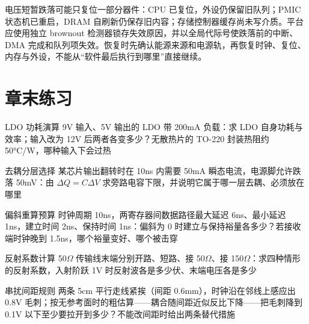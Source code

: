 
电压短暂跌落可能只复位一部分器件：CPU 已复位，外设仍保留旧队列；PMIC 状态机已重启，DRAM 自刷新仍保存旧内容；存储控制器缓存尚未写介质。平台应使用独立 brownout 检测器锁存失效原因，并以全局代际号使跌落前的中断、DMA 完成和队列项失效。恢复时先确认能源来源和电源轨，再恢复时钟、复位、内存与外设，不能从“软件最后执行到哪里”直接继续。

\section*{章末练习}

\begin{chapterexercise}{LDO 功耗演算}
9V 输入、5V 输出的 LDO 带 200mA 负载：求 LDO 自身功耗与效率；输入改为 12V 后两者各变多少？无散热片的 TO-220 封装热阻约 50°C/W，哪种输入下会过热
\end{chapterexercise}

\begin{chapterexercise}{去耦分层选择}
某芯片输出翻转时在 10ns 内需要 50mA 瞬态电流，电源脚允许跌落 50mV：由 $\Delta Q = C\Delta V$ 求旁路电容下限，并说明它属于哪一层去耦、必须放在哪里
\end{chapterexercise}

\begin{chapterexercise}{偏斜重算预算}
时钟周期 10ns，两寄存器间数据路径最大延迟 6ns、最小延迟 1ns，建立时间 2ns、保持时间 1ns：偏斜为 0 时建立与保持裕量各多少？若接收端时钟晚到 1.5ns，哪个裕量变好、哪个被击穿
\end{chapterexercise}

\begin{chapterexercise}{反射系数计算}
50$\Omega$ 传输线末端分别开路、短路、接 50$\Omega$、接 150$\Omega$：求四种情形的反射系数，入射阶跃 1V 时反射波各是多少伏、末端电压各是多少
\end{chapterexercise}

\begin{chapterexercise}{串扰间距规则}
两条 5cm 平行走线紧挨（间距 0.6mm），时钟沿在邻线上感应出 0.8V 毛刺；按无参考面时的粗估算——耦合随间距近似反比下降——把毛刺降到 0.1V 以下至少要拉开到多少？不能改间距时给出两条替代措施
\end{chapterexercise}

